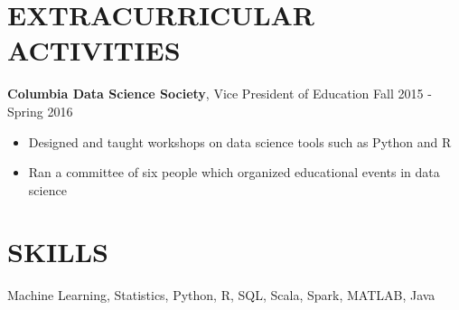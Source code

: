 \documentclass{res}
\begin{document}
\begin{resume}
\begin{comment}
\textbf{Columbia University Departments of Mathematics and Statistics}, New York, NY
  \\ \textit{Undergraduate Teaching Assistant}\hfill Spring 2014 - Spring 2016
\begin{itemize}
\item Held regular office hours for calculus, linear algebra, and statistics students
\item Evaluated assignments and provided feedback to students
\end{itemize}
\end{comment}


\section{EXTRACURRICULAR ACTIVITIES}
	\textbf{Columbia Data Science Society}, Vice President of Education \hfill Fall 2015 - Spring 2016
	\begin{itemize}
	\item Designed and taught workshops on data science tools such as Python and R
	\item Ran a committee of six people which organized educational events in data science
	\end{itemize}
\begin{comment}	
	\textbf{Personal Projects} (On Github)
	\begin{itemize}
	\item Qlearning: Implementation of deep reinforcement learning algorithms
	\item brownian: Simulation of Brownian motion and general stochastic differential equations
	\item memm\_tagging: Implementation of a Maximum Entropy Markov Model 
	\end{itemize}
\end{comment}
\section{SKILLS}
	Machine Learning, Statistics, Python, R, SQL, Scala, Spark, MATLAB, Java


\end{resume}
\end{document}
